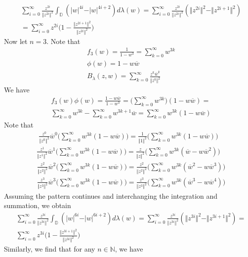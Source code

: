 \documentclass[12pt]{article}
\begin{document}
\begin{align}
&\sum_{i=0}^\infty \frac{z^{2i}}{\Vert z^{2i} \Vert^2} \int_\mathbb{\mathbb{D}} (\vert w \vert^{4i} - \vert w \vert^{4i + 2}) d\lambda(w) = \sum_{i=0}^\infty \frac{z^{2i}}{\Vert z^{2i} \Vert^2}(\Vert z^{2i} \Vert^2 -  \Vert z^{2i+1} \Vert^2)\\
&  = \sum_{i=0}^\infty z^{2i} \bigg(1 - \frac{\Vert z^{2i+1}\Vert^2}{\Vert z^{2i}\Vert^2}\bigg)
\end{align} Now let $n = 3$. Note that
\begin{align}
&f_3(w) = \frac{1}{1-w^3} = \sum_{k=0}^\infty w^{3k} \\
&\phi(w) = 1 - w \overline{w}\\
&B_\lambda(z,w) = \sum_{k=0}^\infty \frac{z^k \overline{w}^k}{\Vert z^k \Vert^2} 
\end{align} We have
\begin{align}
&f_3(w) \phi(w) = \frac{1-w\overline{w}}{1-w^3} = \Bigg(\sum_{k=0}^\infty w^{3k}\Bigg)(1 - w\overline{w}) = \\
& \sum_{k=0}^\infty w^{3k} - \sum_{k=0}^\infty w^{3k+1}\overline{w} = \sum_{k=0}^\infty w^{3k}(1 - w\overline{w})
\end{align} Note that
\begin{align}
\frac{z^0}{\Vert z^0 \Vert^2} \overline{w}^0 \Bigg(\sum_{k=0}^\infty w^{3k}(1 - w\overline{w})\Bigg) =\frac{1}{\Vert 1 \Vert^2} \Bigg(\sum_{k=0}^\infty w^{3k}(1 - w\overline{w})\Bigg)
\end{align}
\begin{align}
\frac{z^1}{\Vert z^1 \Vert^2} \overline{w}^1 \Bigg(\sum_{k=0}^\infty w^{3k}(1 - w\overline{w})\Bigg) = \frac{z}{\Vert z \Vert^2}\Bigg(\sum_{k=0}^\infty w^{3k}(\overline{w} - w\overline{w}^2)\Bigg)
\end{align}
\begin{align}
&\frac{z^2}{\Vert z^2 \Vert^2} \overline{w}^2 \Bigg(\sum_{k=0}^\infty w^{3k}(1 - w\overline{w})\Bigg)= \frac{z^2}{\Vert z^2 \Vert^2} \Bigg(\sum_{k=0}^\infty w^{3k}(\overline{w}^2 - w\overline{w}^3)\Bigg)
\end{align}
\begin{align}
&\frac{z^3}{\Vert z^3 \Vert^2} \overline{w}^3 \Bigg(\sum_{k=0}^\infty w^{3k}(1 - w\overline{w})\Bigg) = \frac{z^3}{\Vert z^3 \Vert^2}\Bigg(\sum_{k=0}^\infty w^{3k}(\overline{w}^3 - w\overline{w}^4)\Bigg)
\end{align} Assuming the pattern continues and interchanging the integration and summation, we obtain
\begin{align}
& \sum_{i=0}^\infty \frac{z^{3i}}{\Vert z^{3i}\Vert^2} \int_\mathbb{D} (\vert w \vert^{6i} - \vert w \vert^{6i+2}) d\lambda(w)  = \sum_{i=0}^\infty \frac{z^{3i}}{\Vert z^{3i} \Vert^2}(\Vert z^{3i} \Vert^2 - \Vert z^{3i+1}\Vert^2) = \\
& \sum_{i=0}^\infty z^{3i}\bigg(1 - \frac{\Vert z^{3i+1}\Vert^2}{\Vert z^{3i}\Vert^2}\bigg)
\end{align} Similarly, we find that for any $n \in \mathbb{N}$, we have
\end{document}
